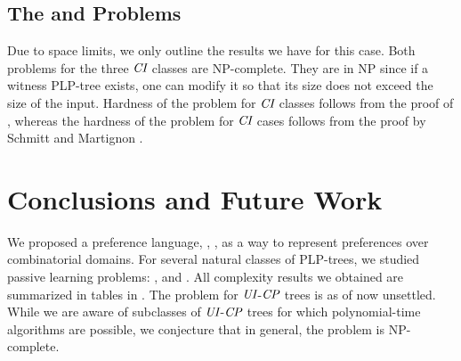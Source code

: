 \vspace{-0.1cm}
\subsection{The  and  Problems}

\vspace{-0.1cm}
Due to space limits, we only outline the results we have for this case. 
Both problems for the three $\textit{CI}$ classes are NP-complete. They are in 
NP since if a witness PLP-tree exists, one can modify it so that 
its size does not exceed the size of the input. Hardness of the 
 problem for $\textit{CI}$ classes follows from the proof of 
, whereas the hardness of the 
 problem for $\textit{CI}$ cases follows from the proof 
by Schmitt and Martignon .




\section{Conclusions and Future Work}
We proposed a preference language, , , as a way to represent preferences over combinatorial 
domains. For several natural classes of PLP-trees, we studied passive learning 
problems: ,  and . All complexity
results we obtained are summarized in tables in . The
 problem for $\textit{UI}$-$\textit{CP}$ trees is as of now unsettled. While we are aware 
of subclasses of $\textit{UI}$-$\textit{CP}$ trees for which polynomial-time algorithms are 
possible, we conjecture that in general, the problem is NP-complete.

